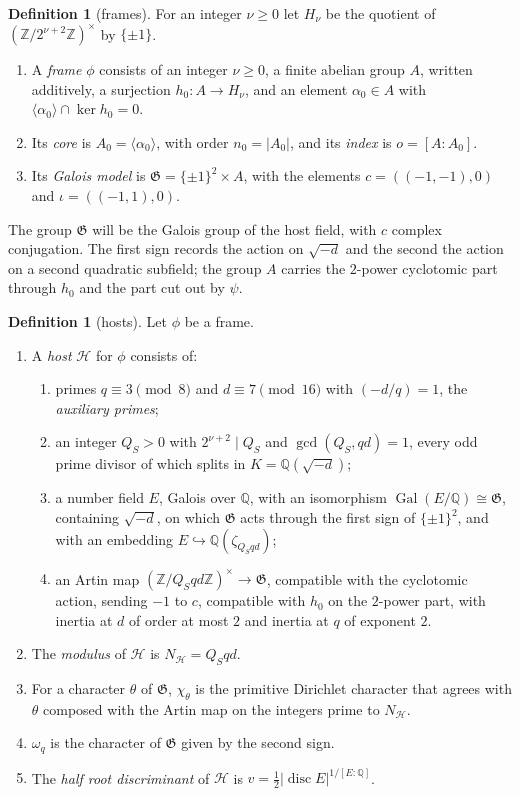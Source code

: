 \documentclass[11pt]{amsbook}
\theoremstyle{plain}
\theoremstyle{definition}
\newtheorem{definition}[theorem]{Definition}
\theoremstyle{remark}
\numberwithin{equation}{section}
\numberwithin{figure}{chapter}
\numberwithin{table}{chapter}
\newcommand{\Q}{\mathbb{Q}}
\newcommand{\Z}{\mathbb{Z}}
\newcommand{\Gal}{\operatorname{Gal}}
\newcommand{\GG}{\mathfrak{G}}
\begin{document}
\begin{definition}[frames]\label{def:frame}
For an integer $\nu\ge0$ let $H_\nu$ be the quotient of
$(\Z/2^{\nu+2}\Z)^\times$ by $\{\pm1\}$.
\begin{enumerate}[label=(\arabic*)]
\item A \emph{frame} $\phi$ consists of an integer $\nu\ge0$, a finite
abelian group $A$, written additively, a surjection $h_0\colon A\to
H_\nu$, and an element $\alpha_0\in A$ with $\langle\alpha_0\rangle
\cap\ker h_0=0$.
\item Its \emph{core} is $A_0=\langle\alpha_0\rangle$, with order
$n_0=|A_0|$, and its \emph{index} is $o=[A:A_0]$.
\item Its \emph{Galois model} is $\GG=\{\pm1\}^2\times A$, with the
elements $c=((-1,-1),0)$ and $\iota=((-1,1),0)$.
\end{enumerate}
\end{definition}

The group $\GG$ will be the Galois group of the host field, with $c$
complex conjugation. The first sign records the action on
$\sqrt{-d}$ and the second the action on a second quadratic subfield;
the group $A$ carries the
$2$-power cyclotomic part through $h_0$ and the part cut out by
$\psi$.

\begin{definition}[hosts]\label{def:host}
Let $\phi$ be a frame.
\begin{enumerate}[label=(\arabic*)]
\item A \emph{host} $\mathcal H$ for $\phi$ consists of:
\begin{enumerate}[label=(\roman*)]
\item primes $q\equiv3\pmod 8$ and $d\equiv7\pmod{16}$ with
$(-d/q)=1$, the \emph{auxiliary primes};
\item an integer $Q_S>0$ with $2^{\nu+2}\mid Q_S$ and
$\gcd(Q_S,qd)=1$, every odd prime divisor of which splits in
$K=\Q(\sqrt{-d})$;
\item a number field $E$, Galois over $\Q$, with an isomorphism
$\Gal(E/\Q)\cong\GG$, containing $\sqrt{-d}$, on which $\GG$ acts
through the first sign of $\{\pm1\}^2$, and with an embedding
$E\hookrightarrow\Q(\zeta_{Q_Sqd})$;
\item an Artin map $(\Z/Q_Sqd\Z)^\times\to\GG$, compatible with the
cyclotomic action, sending $-1$ to $c$, compatible with $h_0$ on the
$2$-power part, with inertia at $d$ of order at most $2$ and inertia
at $q$ of exponent $2$.
\end{enumerate}
\item The \emph{modulus} of $\mathcal H$ is $N_{\mathcal H}=Q_Sqd$.
\item For a character $\theta$ of $\GG$, $\chi_\theta$ is the
primitive Dirichlet character that agrees with $\theta$ composed with
the Artin map on the integers prime to $N_{\mathcal H}$.
\item $\omega_q$ is the character of $\GG$ given by the second sign.
\item The \emph{half root discriminant} of $\mathcal H$ is
$v=\frac12|\operatorname{disc}E|^{1/[E:\Q]}$.
\end{enumerate}
\end{definition}
\end{document}

